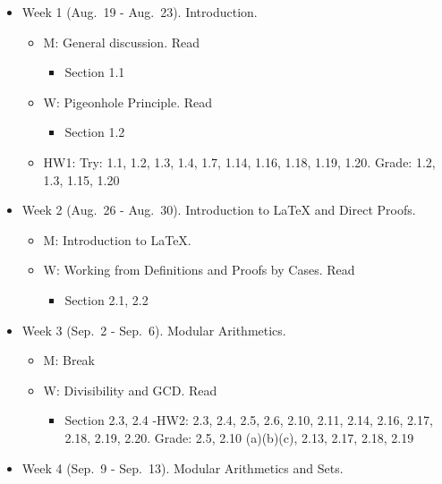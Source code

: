 \documentclass[
]{article}
\providecommand{\tightlist}{%
  \setlength{\itemsep}{0pt}\setlength{\parskip}{0pt}}
\begin{document}
\begin{itemize}
\item
  Week 1 (Aug.~19 - Aug.~23). Introduction.

  \begin{itemize}
  \tightlist
  \item
    M: General discussion. Read

    \begin{itemize}
    \tightlist
    \item
      Section 1.1
    \end{itemize}
  \item
    W: Pigeonhole Principle. Read

    \begin{itemize}
    \tightlist
    \item
      Section 1.2
    \end{itemize}
  \item
    HW1: Try: 1.1, 1.2, 1.3, 1.4, 1.7, 1.14, 1.16, 1.18, 1.19, 1.20. Grade: 1.2, 1.3, 1.15, 1.20
  \end{itemize}
\item
  Week 2 (Aug.~26 - Aug.~30). Introduction to LaTeX and Direct Proofs.

  \begin{itemize}
  \tightlist
  \item
    M: Introduction to LaTeX.
  \item
    W: Working from Definitions and Proofs by Cases. Read

    \begin{itemize}
    \tightlist
    \item
      Section 2.1, 2.2
    \end{itemize}
  \end{itemize}
\item
  Week 3 (Sep.~2 - Sep.~6). Modular Arithmetics.

  \begin{itemize}
  \tightlist
  \item
    M: Break
  \item
    W: Divisibility and GCD. Read

    \begin{itemize}
    \tightlist
    \item
      Section 2.3, 2.4
      -HW2: 2.3, 2.4, 2.5, 2.6, 2.10, 2.11, 2.14, 2.16, 2.17, 2.18, 2.19, 2.20. Grade: 2.5, 2.10 (a)(b)(c), 2.13, 2.17, 2.18, 2.19
    \end{itemize}
  \end{itemize}
\item
  Week 4 (Sep.~9 - Sep.~13). Modular Arithmetics and Sets.


\end{itemize}
\end{document}
